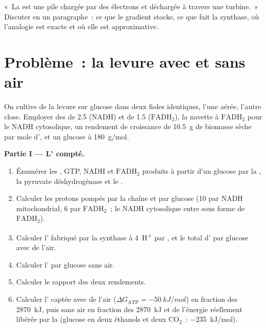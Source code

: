 \begin{exercise}[$\star\star\star$]\label{exo:b1:respiration-fermentation:12}
«~La  est une pile chargée par des électrons et déchargée à
travers une turbine.~» Discuter en un paragraphe~: ce que le gradient
stocke, ce que fait la synthase, où l'analogie est exacte et où elle est
approximative.
\end{exercise}

\section{Problème~: la levure avec et sans air}

\begin{problem}
\label{pb:b1:respiration-fermentation:1}
On cultive de la levure sur glucose dans deux fioles identiques, l'une
aérée, l'autre close. Employer des  de 2.5 (NADH) et de 1.5
($\mathrm{FADH_2}$), la navette à $\mathrm{FADH_2}$ pour le NADH
cytosolique, un rendement de croissance de \qty{10.5}{g} de biomasse
sèche par mole d', et un glucose à \qty{180}{g/mol}.

\medskip
\noindent\textbf{Partie I --- L' compté.}
\begin{enumerate}
  \item Énumérer les , GTP, NADH et $\mathrm{FADH_2}$ produits à
        partir d'un glucose par la , la pyruvate
        déshydrogénase et le .
  \item Calculer les protons pompés par la chaîne et par glucose (10 par
        NADH mitochondrial, 6 par $\mathrm{FADH_2}$~; le NADH cytosolique
        entre sous forme de $\mathrm{FADH_2}$).
  \item Calculer l' fabriqué par la synthase à \qty{4}{H^+} par ,
        et le total d' par glucose avec de l'air.
  \item Calculer l' par glucose sans air.
  \item Calculer le rapport des deux rendements.
  \item Calculer l' captée avec de l'air
        ($\Delta G_{\text{ATP}}
        = \qty{-50}{kJ/mol}$) en fraction des \qty{2870}{kJ}, puis sans
        air en fraction des \qty{2870}{kJ} et de l'énergie réellement
        libérée par la  (glucose en deux éthanols et deux
        $\mathrm{CO_2}$~: \qty{-235}{kJ/mol}).
\end{enumerate}


\end{problem}
